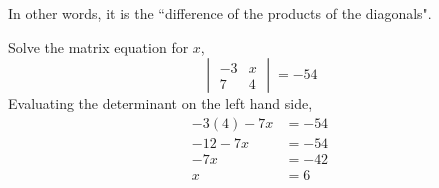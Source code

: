 \documentclass[letterpaper,12pt]{article}
\begin{document}
In other words, it is the ``difference of the products of the diagonals".

\begin{example}
Solve the matrix equation for $x$,
\begin{equation*}
    \begin{vmatrix} -3 & x \\ 7 & 4 \end{vmatrix} = -54
\end{equation*}
Evaluating the determinant on the left hand side,
\begin{align*}
    -3(4) - 7x & = -54 \\
    -12 - 7x & = -54 \\
    -7x & = -42 \\
    x & = 6
\end{align*}
\end{example}
\end{document}
